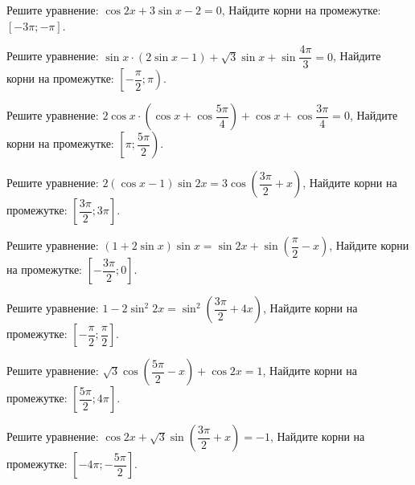 \begin{class}[number=8]
	\begin{listofex}
		\item %
		\begin{tasks}
			\task Решите уравнение: \( \cos{2x}+3\sin{x}-2=0 \), %
			\task Найдите корни на промежутке: \( [-3\pi;-\pi] \).
		\end{tasks}
		\item %
		\begin{tasks}
			\task Решите уравнение: \( \sin{x} \cdot (2\sin{x}-1) + \sqrt{3} \sin{x} + \sin{\dfrac{4\pi}{3}}=0 \), 
			\task Найдите корни на промежутке: \( \left[ -\dfrac{\pi}{2};\pi \right) \).
		\end{tasks}
		\item %
		\begin{tasks}
			\task Решите уравнение: \( 2\cos{x} \cdot \left( \cos{x}+\cos{\dfrac{5\pi}{4}} \right) + \cos{x} + \cos{\dfrac{3\pi}{4}}=0  \),
			\task Найдите корни на промежутке: \( \left[ \pi; \dfrac{5\pi}{2} \right) \).
		\end{tasks}
		\item %
		\begin{tasks}
			\task Решите уравнение: \( 2(\cos{x}-1)\sin{2x}=3 \cos{ \left( \dfrac{3\pi}{2}+x \right) } \),
			\task Найдите корни на промежутке: \( \left[ \dfrac{3\pi}{2}; 3\pi \right] \).
		\end{tasks}
		\item %
		\begin{tasks}
			\task Решите уравнение: \( (1+2\sin{x})\sin{x}=\sin{2x}+\sin{ \left( \dfrac{\pi}{2}-x \right) } \),
			\task Найдите корни на промежутке: \( \left[ -\dfrac{3\pi}{2}; 0 \right]  \).
		\end{tasks}
		\item %
		\begin{tasks}
			\task Решите уравнение: \( 1-2\sin^2{2x}=\sin^2{\left( \dfrac{3\pi}{2} + 4x \right) } \),
			\task Найдите корни на промежутке: \( \left[ -\dfrac{\pi}{2}; \dfrac{\pi}{2} \right] \).
		\end{tasks}
		\item %
		\begin{tasks}
			\task Решите уравнение: \( \sqrt{3} \cos{ \left( \dfrac{5\pi}{2}-x \right) } + \cos{2x}=1 \),
			\task Найдите корни на промежутке: \( \left[ \dfrac{5\pi}{2}; 4\pi \right] \).
		\end{tasks}
		\item %
		\begin{tasks}
			\task Решите уравнение: \( \cos{2x} + \sqrt{3} \sin{ \left( \dfrac{3\pi}{2}+x \right)}=-1  \),
			\task Найдите корни на промежутке: \( \left[ -4 \pi ; -\dfrac{5\pi}{2} \right] \).
		\end{tasks}
	\end{listofex}
\end{class}

